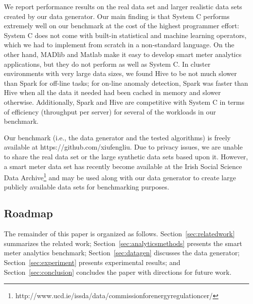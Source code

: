 \documentclass[prodmode,acmtods]{acmsmall}
\begin{document}
We report performance results on the real data set and larger realistic data sets created by our data generator.  Our main finding is that System C performs extremely well on our benchmark at the cost of the highest programmer effort: System C does not come with built-in statistical and machine learning operators, which we had to implement from scratch in a non-standard language.  On the other hand, MADlib and Matlab make it easy to develop smart meter analytics applications, but they do not perform as well as System C.  In cluster environments with very large data sizes, we found Hive to be not much slower than Spark for off-line tasks; for on-line anomaly detection, Spark was faster than Hive when all the data it needed had been cached in memory and slower otherwise.  Additionally, Spark and Hive are competitive with System C in terms of efficiency (throughput per server) for several of the workloads in our benchmark.


Our benchmark (i.e., the data generator and the tested algorithms) is freely available at https://github.com/xiufengliu.  Due to privacy issues, we are unable to share the real data set or the large synthetic data sets based upon it.  However, a smart meter data set has recently become available at the Irish Social Science Data Archive\footnote{
http://www.ucd.ie/issda/data/commissionforenergyregulationcer/
} and may be used along with our data generator to create large publicly available data sets for benchmarking purposes.

\subsection{Roadmap}

The remainder of this paper is organized as follows. 
Section~\ref{sec:relatedwork} summarizes the related work;
Section~\ref{sec:analyticsmethods} presents the smart meter analytics benchmark;
Section~\ref{sec:datagen} discusses the data generator;
Section~\ref{sec:experiment} presents experimental results; 
and Section~\ref{sec:conclusion} concludes the paper with directions for future work.
\end{document}

